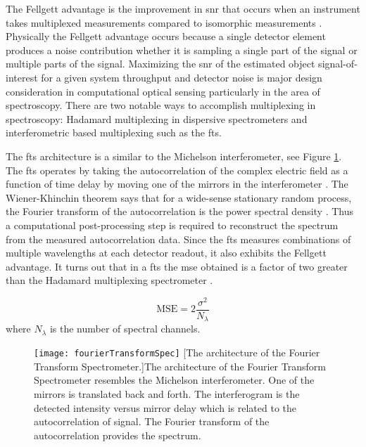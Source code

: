 The \gls{Fellgett advantage} is the improvement in \gls{snr} that occurs when an instrument takes multiplexed measurements compared to isomorphic measurements \cite{fellgett1958principes, davis2001fourier}. Physically the \gls{Fellgett advantage}  occurs because a single detector element produces a noise contribution whether it is sampling a single part of the signal or multiple parts of the signal. Maximizing the \acrfull{snr} of the estimated object signal-of-interest for a given system throughput and detector noise is major design consideration in computational optical sensing particularly in the area of spectroscopy. There are two notable ways to accomplish multiplexing in spectroscopy: Hadamard multiplexing in dispersive spectrometers and interferometric based multiplexing such as the \gls{fts}. 

The \gls{fts} architecture is a similar to the Michelson interferometer, see Figure \ref{fig:fourierTransformSpec}. The \gls{fts} operates by taking the autocorrelation of the complex electric field as a function of time delay by moving one of the mirrors in the interferometer \cite{davis2001fourier}. The Wiener-Khinchin theorem says that for a wide-sense stationary random process, the Fourier transform of the autocorrelation is the power spectral density \cite{goodman2015statistical}. Thus a computational post-processing step is required to reconstruct the spectrum from the measured autocorrelation data. Since the \gls{fts} measures combinations of multiple wavelengths at each detector readout, it also exhibits the \gls{Fellgett advantage}. It turns out that in a \gls{fts} the \gls{mse} obtained is a factor of two greater than the Hadamard multiplexing spectrometer \cite{tai1976fourier}. 

\begin{equation}
	\text{MSE} = 2 \frac{\sigma^2}{N_{\lambda}} 
\end{equation}
%
where $N_{\lambda}$ is the number of spectral channels. 
%
\begin{figure}
	\texttt{[image: fourierTransformSpec]}
	[The architecture of the Fourier Transform Spectrometer.]{The architecture of the Fourier Transform Spectrometer resembles the Michelson interferometer. One of the mirrors is translated back and forth. The interferogram is the detected intensity versus mirror delay which is related to the autocorrelation of signal. The Fourier transform of the autocorrelation provides the spectrum.}
	\label{fig:fourierTransformSpec}
\end{figure}


